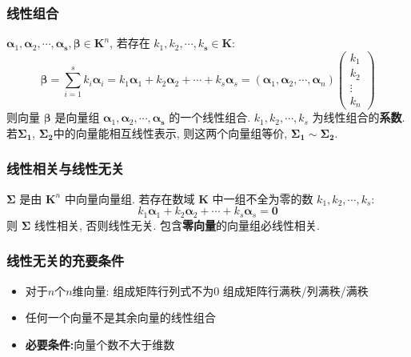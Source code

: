 \documentclass{article}
\begin{document}
			\subsubsection{线性组合}
				$\boldsymbol{\alpha}_{1}, \boldsymbol{\alpha}_{2}, \cdots, \boldsymbol{\alpha}_{\boldsymbol{s}}, \boldsymbol{\beta} \in \mathbf{K}^{n}$, 若存在 $k_{1}, k_{2}, \cdots, k_{\boldsymbol{s}} \in \mathbf{K}$:
				$$
				\boldsymbol{\beta}=\sum_{i=1}^{s} k_{i} \boldsymbol{\alpha}_{i}=k_{1} \boldsymbol{\alpha}_{1}+k_{2} \boldsymbol{\alpha}_{2}+\cdots+k_{s} 	\boldsymbol{\alpha}_{s}=(\boldsymbol{\alpha}_1,\boldsymbol{\alpha}_2,\cdots,\boldsymbol{\alpha}_n)\left(\begin{array}{l}
					k_{1} \\
					k_{2} \\
					\vdots \\
					k_{n}
				\end{array}\right)
				$$
				则向量 $\boldsymbol{\beta}$ 是向量组 $\boldsymbol{\alpha}_{1}, \boldsymbol{\alpha}_{2}, \cdots, \boldsymbol{\alpha}_{\boldsymbol{s}}$ 的一个线性组合. $k_{1}, k_{2}, \cdots, k_{s}$ 为线性组合的\textbf{系数}.
				若$\boldsymbol{\Sigma_1}$, $\boldsymbol{\Sigma_2}$中的向量能相互线性表示, 则这两个向量组等价, $\boldsymbol{\Sigma_1}\sim\boldsymbol{\Sigma_2}$.
			\subsubsection{线性相关与线性无关}
				$\boldsymbol{\Sigma}$ 是由 $\mathbf{K}^{n}$ 中向量向量组. 若存在数域 $\mathbf{K}$ 中一组不全为零的数 $k_{1}, k_{2}, \cdots, k_{s}$:
				$$
				k_{1} \boldsymbol{\alpha}_{1}+k_{2} \boldsymbol{\alpha}_{2}+\cdots+k_{s} \boldsymbol{\alpha}_{s}=\mathbf{0}
				$$
				则 $\boldsymbol{\Sigma}$ 线性相关, 否则线性无关. 包含\textbf{零向量}的向量组必线性相关.
				\subsubsection*{线性无关的充要条件}
					\begin{itemize}
						\item 对于$n$个$n$维向量:
							\subitem 组成矩阵行列式不为0
							\subitem 组成矩阵行满秩/列满秩/满秩
						\item 任何一个向量不是其余向量的线性组合
						\item \textbf{必要条件:}向量个数不大于维数
					\end{itemize}
\end{document}
